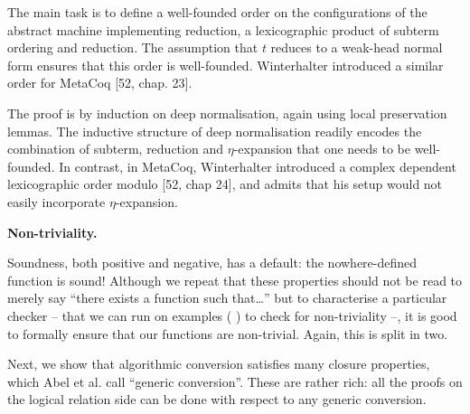 \documentclass[10pt,a4paper]{amsart}
\begin{document}
 
 
 
The main task is to define a well-founded order on the configurations of the abstract machine implementing reduction, a lexicographic product of subterm ordering and reduction. The assumption that $t$ reduces to a weak-head normal form ensures that this order is well-founded. Winterhalter introduced a similar order for MetaCoq [52, chap. 23].\par
 

 
The proof is by induction on deep normalisation, again using local preservation lemmas. The inductive structure of deep normalisation readily encodes the combination of subterm, reduction and $\eta$-expansion that one needs to be well-founded. In contrast, in MetaCoq, Winterhalter introduced a complex dependent lexicographic order modulo [52, chap 24], and admits that his setup would not easily incorporate $\eta$-expansion.\par
 
 
 
 
\par\medskip\noindent\textbf{Non-triviality.}\par
 
 
Soundness, both positive and negative, has a default: the nowhere-defined function is sound! Although we repeat that these properties should not be read to merely say “there exists a function such that…” but to characterise a particular checker – that we can run on examples ( ) to check for non-triviality –, it is good to formally ensure that our functions are non-trivial. Again, this is split in two.\par
 

 
Next, we show that algorithmic conversion satisfies many closure properties, which Abel et al. call “generic conversion”. These are rather rich: all the proofs on the logical relation side can be done with respect to any generic conversion.\par
 
\end{document}
